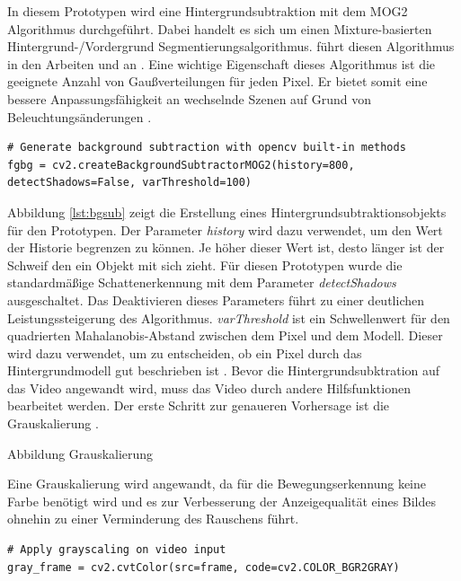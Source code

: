 In diesem Prototypen wird eine Hintergrundsubtraktion mit dem \ac{MOG}2 Algorithmus durchgeführt. Dabei handelt es sich um einen Mixture-basierten Hintergrund-/Vordergrund Segmentierungsalgorithmus. \citeauthor{ZIVKOVIC2006773} führt diesen Algorithmus in den Arbeiten  und  an \cites{1333992}{ZIVKOVIC2006773}. Eine wichtige Eigenschaft dieses Algorithmus ist die geeignete Anzahl von Gaußverteilungen für jeden Pixel. Er bietet somit eine bessere Anpassungsfähigkeit an wechselnde Szenen auf Grund von Beleuchtungsänderungen \cite{opencv_bg_subtraction2}. 

\vspace*{10mm}
\begin{lstlisting}[caption={Generation der Hintergrundsubtraktion}, label={lst:bgsub}]
# Generate background subtraction with opencv built-in methods    
fgbg = cv2.createBackgroundSubtractorMOG2(history=800, detectShadows=False, varThreshold=100)
\end{lstlisting}

Abbildung \ref{lst:bgsub} zeigt die Erstellung eines Hintergrundsubtraktionsobjekts für den Prototypen. Der Parameter \emph{history} wird dazu verwendet, um den Wert der Historie begrenzen zu können. Je höher dieser Wert ist, desto länger ist der Schweif den ein Objekt mit sich zieht. Für diesen Prototypen wurde die standardmäßige Schattenerkennung mit dem Parameter \emph{detectShadows} ausgeschaltet. Das Deaktivieren dieses Parameters führt zu einer deutlichen Leistungssteigerung des Algorithmus. \emph{varThreshold} ist ein Schwellenwert für den quadrierten Mahalanobis-Abstand zwischen dem Pixel und dem Modell. Dieser wird dazu verwendet, um zu entscheiden, ob ein Pixel durch das Hintergrundmodell gut beschrieben ist \cite{opencv_bg_subtraction3}. Bevor die Hintergrundsubktration auf das Video angewandt wird, muss das Video durch andere Hilfsfunktionen bearbeitet werden. Der erste Schritt zur genaueren Vorhersage ist die Grauskalierung \cite{cv_opencv}. 

Abbildung Grauskalierung

Eine Grauskalierung wird angewandt, da für die Bewegungserkennung keine Farbe benötigt wird und es zur Verbesserung der Anzeigequalität eines Bildes ohnehin zu einer Verminderung des Rauschens führt. 

\vspace*{10mm}
\begin{lstlisting}[caption={Graustufen auf das Video anwenden}, label={lst:grayscaling}]
# Apply grayscaling on video input
gray_frame = cv2.cvtColor(src=frame, code=cv2.COLOR_BGR2GRAY)
\end{lstlisting}

